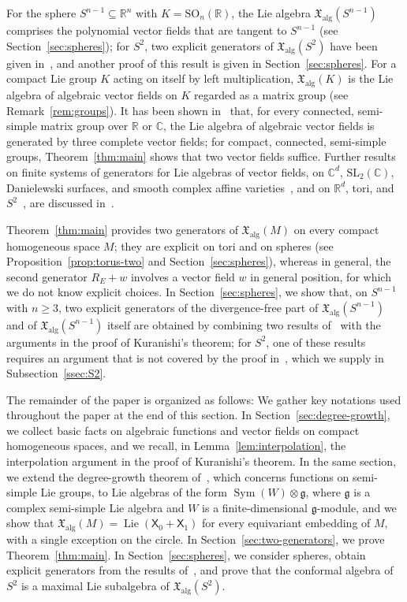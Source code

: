 \documentclass{article}
\newcommand{\R}{\mathbb{R}}
\newcommand{\C}{\mathbb{C}}
\newcommand{\frakg}{\mathfrak{g}}
\newcommand{\xalg}{\mathfrak X_{\mathrm{alg}}}
\newcommand{\sX}{\mathsf{X}}
\newcommand{\Sym}{\operatorname{Sym}}
\theoremstyle{definition}
\theoremstyle{plain}
\begin{document}
For the sphere $S^{n-1}\subseteq\R^n$ with $K=\mathrm{SO}_n(\R)$, the Lie algebra $\xalg(S^{n-1})$ comprises the polynomial vector fields that are tangent to $S^{n-1}$ (see Section~\ref{sec:spheres}); for $S^2$,
    two explicit generators of $\xalg(S^2)$ have been given in~\cite{CofDS2}, and another proof of this result is given in Section~\ref{sec:spheres}.
For a compact Lie group $K$ acting on itself by left multiplication, $\xalg(K)$ is the Lie algebra of algebraic vector fields on $K$ regarded as a matrix group (see Remark~\ref{rem:groups}). It has been shown in~\cite{CofD3gen} that, for every connected, semi-simple matrix group over $\R$ or $\C$, the Lie algebra of algebraic vector fields is generated by three complete vector fields; for compact, connected, semi-simple groups, Theorem~\ref{thm:main} shows that two vector fields suffice. 
 Further results on finite systems of generators for Lie algebras of vector fields, on $\C^d$, $\mathrm{SL}_2(\C)$, Danielewski surfaces, and smooth complex affine varieties~\cite{AndristCn,BeldievPogudin,AndristSLtwo,AndristNew,AndristDanielewski,Bouaziz26}, and on $\R^d$, tori, and $S^2$~\cite[Section~6]{AS22}, are discussed in~\cite[Section~1]{CofD3gen}.



 Theorem~\ref{thm:main} provides two generators of $\xalg(M)$ on every compact homogeneous space $M$; they are explicit on tori and on spheres (see Proposition~\ref{prop:torus-two} and Section~\ref{sec:spheres}), whereas in general, the second generator $R_E+w$ involves a vector field $w$ in general position, for which we do not know explicit choices.
In Section~\ref{sec:spheres}, we show that, on $S^{n-1}$ with $n\geq3$, two explicit generators of the divergence-free part of $\xalg(S^{n-1})$ and of $\xalg(S^{n-1})$ itself are obtained by combining two results of~\cite{Luk77} with the arguments in the proof of Kuranishi's theorem; for $S^2$,
  one of these results requires an argument that is not covered by the proof in~\cite{Luk77}, which we supply in Subsection~\ref{ssec:S2}.


The remainder of the paper is organized as follows: We gather key notations used throughout the paper at the end of this section.
In Section~\ref{sec:degree-growth}, we collect basic facts on algebraic functions and vector fields on compact homogeneous spaces,
    and we recall, in Lemma~\ref{lem:interpolation}, the interpolation argument in the proof of Kuranishi's theorem.
In the same section, we extend the degree-growth theorem of~\cite{CofD3gen}, which concerns functions on semi-simple Lie groups, to Lie algebras of the form $\Sym(W)\otimes\frakg$, where $\frakg$ is a complex semi-simple Lie algebra and $W$ is a finite-dimensional $\frakg$-module, and we show that $\xalg(M)=\operatorname{Lie}(\sX_0+\sX_1)$ for every equivariant embedding of $M$, with a single exception on the circle.
In Section~\ref{sec:two-generators}, we prove Theorem~\ref{thm:main}.
 In Section~\ref{sec:spheres}, we consider spheres, obtain explicit generators from the results of~\cite{Luk77}, and prove that the conformal algebra of $S^2$ is a maximal Lie subalgebra of $\xalg(S^2)$.
\end{document}

